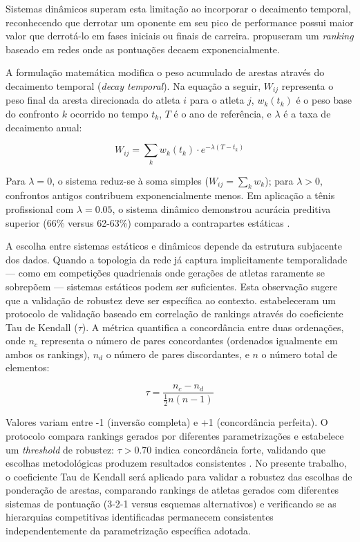 Sistemas dinâmicos superam esta limitação ao incorporar o decaimento temporal, reconhecendo que derrotar um oponente em seu pico de performance possui maior valor que derrotá-lo em fases iniciais ou finais de carreira.  propuseram um \textit{ranking} baseado em redes onde as pontuações decaem exponencialmente.

A formulação matemática modifica o peso acumulado de arestas através do decaimento temporal (\textit{decay temporal}). Na equação a seguir, $W_{ij}$ representa o peso final da aresta direcionada do atleta $i$ para o atleta $j$, $w_k(t_k)$ é o peso base do confronto $k$ ocorrido no tempo $t_k$, $T$ é o ano de referência, e $\lambda$ é a taxa de decaimento anual:

\[
W_{ij} = \sum_{k} w_k(t_k) \cdot e^{-\lambda (T - t_k)}
\]

Para $\lambda = 0$, o sistema reduz-se à soma simples ($W_{ij} = \sum_k w_k$); para $\lambda > 0$, confrontos antigos contribuem exponencialmente menos. Em aplicação a tênis profissional com $\lambda = 0.05$, o sistema dinâmico demonstrou acurácia preditiva superior (66\% versus 62-63\%) comparado a contrapartes estáticas \cite{Motegi2012NetworkBased}.

A escolha entre sistemas estáticos e dinâmicos depende da estrutura subjacente dos dados. Quando a topologia da rede já captura implicitamente temporalidade --- como em competições quadrienais onde gerações de atletas raramente se sobrepõem --- sistemas estáticos podem ser suficientes. Esta observação sugere que a validação de robustez deve ser específica ao contexto.  estabeleceram um protocolo de validação baseado em correlação de rankings através do coeficiente Tau de Kendall ($\tau$). A métrica quantifica a concordância entre duas ordenações, onde $n_c$ representa o número de pares concordantes (ordenados igualmente em ambos os rankings), $n_d$ o número de pares discordantes, e $n$ o número total de elementos:

\[
\tau = \frac{n_c - n_d}{\frac{1}{2}n(n-1)}
\]

Valores variam entre -1 (inversão completa) e +1 (concordância perfeita). O protocolo compara rankings gerados por diferentes parametrizações e estabelece um \textit{threshold} de robustez: $\tau > 0.70$ indica concordância forte, validando que escolhas metodológicas produzem resultados consistentes \cite{Shiue2025ApplyingPageRank}. No presente trabalho, o coeficiente Tau de Kendall será aplicado para validar a robustez das escolhas de ponderação de arestas, comparando rankings de atletas gerados com diferentes sistemas de pontuação (3-2-1 versus esquemas alternativos) e verificando se as hierarquias competitivas identificadas permanecem consistentes independentemente da parametrização específica adotada.

